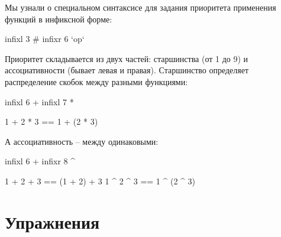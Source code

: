 Мы узнали о специальном синтаксисе для задания приоритета 
применения функций в инфиксной форме:

\begin{code}
infixl 3 #
infixr 6 `op`
\end{code}

Приоритет складывается из двух частей: старшинства (от 1 до 9)
и ассоциативности (бывает левая и правая). Старшинство определяет 
распределение скобок между разными функциями:

\begin{code}
infixl 6 +
infixl 7 *

1 + 2 * 3 == 1 + (2 * 3)
\end{code}


А ассоциативность -- между одинаковыми:

\begin{code}
infixl 6 +
infixr 8 ^

1 + 2 + 3 == (1 + 2) + 3    
1 ^ 2 ^ 3 ==  1 ^ (2 ^ 3)  
\end{code}

\section{Упражнения}

